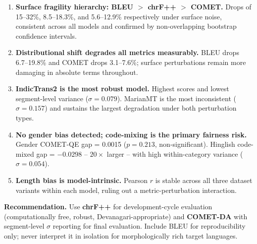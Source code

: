 \documentclass[11pt,a4paper]{article}
\begin{document}
\begin{enumerate}
  \item \textbf{Surface fragility hierarchy: BLEU $>$ chrF++ $>$ COMET.}
    Drops of 15--32\%, 8.5--18.3\%, and 5.6--12.9\% respectively under
    surface noise, consistent across all models and confirmed by
    non-overlapping bootstrap confidence intervals.

  \item \textbf{Distributional shift degrades all metrics measurably.}
    BLEU drops 6.7--19.8\% and COMET drops 3.1--7.6\%; surface
    perturbations remain more damaging in absolute terms throughout.

  \item \textbf{IndicTrans2 is the most robust model.}
    Highest scores and lowest segment-level variance ($\sigma = 0.079$).
    MarianMT is the most inconsistent ($\sigma = 0.157$) and sustains the
    largest degradation under both perturbation types.

  \item \textbf{No gender bias detected; code-mixing is the primary fairness
    risk.} Gender COMET-QE gap = 0.0015 ($p = 0.213$, non-significant).
    Hinglish code-mixed gap = $-0.0298$ -- $20\times$ larger -- with high
    within-category variance ($\sigma = 0.054$).

  \item \textbf{Length bias is model-intrinsic.}
    Pearson $r$ is stable across all three dataset variants within each
    model, ruling out a metric-perturbation interaction.
\end{enumerate}

\noindent\textbf{Recommendation.} Use \textbf{chrF++} for development-cycle
evaluation (computationally free, robust, Devanagari-appropriate) and
\textbf{COMET-DA} with segment-level $\sigma$ reporting for final evaluation.
Include BLEU for reproducibility only; never interpret it in isolation for
morphologically rich target languages.
\end{document}
